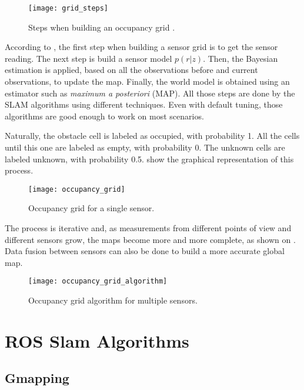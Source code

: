 \begin{figure}[!ht]
    \centering
    \texttt{[image: grid\_steps]}
    \caption{Steps when building an occupancy grid \cite{elfes1989using}.}
    \label{fig:grid_steps}
\end{figure}

According to , the first step when building a sensor grid is to get the sensor reading. The next step is build a sensor model $p(r|z)$. Then, the Bayesian estimation is applied, based on all the observations before and current observations, to update the map. Finally, the world model is obtained using an estimator such as \textit{maximum a posteriori} (MAP). All those steps are done by the SLAM algorithms using different techniques. Even with default tuning, those algorithms are good enough to work on most scenarios.

Naturally, the obstacle cell is labeled as occupied, with probability 1. All the cells until this one are labeled as empty, with probability 0. The unknown cells are labeled unknown, with probability 0.5.  show the graphical representation of this process.

\begin{figure}[!ht]
    \centering
    \texttt{[image: occupancy\_grid]}
    \caption{Occupancy grid for a single sensor.}
    \label{fig:occupancy_grid}
\end{figure}

The process is iterative and, as measurements from different points of view and different sensors grow, the maps become more and more complete, as shown on . Data fusion between sensors can also be done to build a more accurate global map.

\begin{figure}[!ht]
    \centering
    \texttt{[image: occupancy\_grid\_algorithm]}
    \caption{Occupancy grid algorithm for multiple sensors.}
    \label{fig:occupancy_grid_algorithm}
\end{figure}

\section{ROS Slam Algorithms}

\subsection{Gmapping}

